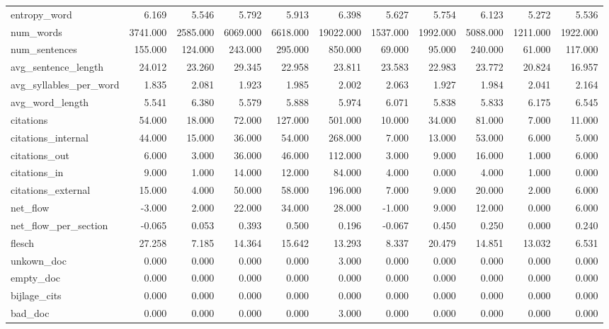 \begin{tabular}{lrrrrrrrrrr}
\cline{1-11}
entropy\_word & 6.169 & 5.546 & 5.792 & 5.913 & 6.398 & 5.627 & 5.754 & 6.123 & 5.272 & 5.536 \\
\cline{1-11}
num\_words & 3741.000 & 2585.000 & 6069.000 & 6618.000 & 19022.000 & 1537.000 & 1992.000 & 5088.000 & 1211.000 & 1922.000 \\
\cline{1-11}
num\_sentences & 155.000 & 124.000 & 243.000 & 295.000 & 850.000 & 69.000 & 95.000 & 240.000 & 61.000 & 117.000 \\
\cline{1-11}
avg\_sentence\_length & 24.012 & 23.260 & 29.345 & 22.958 & 23.811 & 23.583 & 22.983 & 23.772 & 20.824 & 16.957 \\
\cline{1-11}
avg\_syllables\_per\_word & 1.835 & 2.081 & 1.923 & 1.985 & 2.002 & 2.063 & 1.927 & 1.984 & 2.041 & 2.164 \\
\cline{1-11}
avg\_word\_length & 5.541 & 6.380 & 5.579 & 5.888 & 5.974 & 6.071 & 5.838 & 5.833 & 6.175 & 6.545 \\
\cline{1-11}
citations & 54.000 & 18.000 & 72.000 & 127.000 & 501.000 & 10.000 & 34.000 & 81.000 & 7.000 & 11.000 \\
\cline{1-11}
citations\_internal & 44.000 & 15.000 & 36.000 & 54.000 & 268.000 & 7.000 & 13.000 & 53.000 & 6.000 & 5.000 \\
\cline{1-11}
citations\_out & 6.000 & 3.000 & 36.000 & 46.000 & 112.000 & 3.000 & 9.000 & 16.000 & 1.000 & 6.000 \\
\cline{1-11}
citations\_in & 9.000 & 1.000 & 14.000 & 12.000 & 84.000 & 4.000 & 0.000 & 4.000 & 1.000 & 0.000 \\
\cline{1-11}
citations\_external & 15.000 & 4.000 & 50.000 & 58.000 & 196.000 & 7.000 & 9.000 & 20.000 & 2.000 & 6.000 \\
\cline{1-11}
net\_flow & -3.000 & 2.000 & 22.000 & 34.000 & 28.000 & -1.000 & 9.000 & 12.000 & 0.000 & 6.000 \\
\cline{1-11}
net\_flow\_per\_section & -0.065 & 0.053 & 0.393 & 0.500 & 0.196 & -0.067 & 0.450 & 0.250 & 0.000 & 0.240 \\
\cline{1-11}
flesch & 27.258 & 7.185 & 14.364 & 15.642 & 13.293 & 8.337 & 20.479 & 14.851 & 13.032 & 6.531 \\
\cline{1-11}
unkown\_doc & 0.000 & 0.000 & 0.000 & 0.000 & 3.000 & 0.000 & 0.000 & 0.000 & 0.000 & 0.000 \\
\cline{1-11}
empty\_doc & 0.000 & 0.000 & 0.000 & 0.000 & 0.000 & 0.000 & 0.000 & 0.000 & 0.000 & 0.000 \\
\cline{1-11}
bijlage\_cits & 0.000 & 0.000 & 0.000 & 0.000 & 0.000 & 0.000 & 0.000 & 0.000 & 0.000 & 0.000 \\
\cline{1-11}
bad\_doc & 0.000 & 0.000 & 0.000 & 0.000 & 3.000 & 0.000 & 0.000 & 0.000 & 0.000 & 0.000 \\
\cline{1-11}
\bottomrule
\end{tabular}
